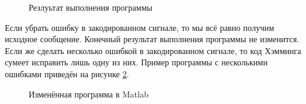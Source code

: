 \documentclass[a4paper,14pt]{extarticle}
\begin{document}
\begin{figure}[H]
\caption{Резлуьтат выполнения программы}
\label{2}
\end{figure}

Если убрать ошибку в закодированном сигнале, то мы всё равно получим исходное сообщение. Конечный результат выполнения программы не изменится.
Если же сделать несколько ошибкой в закодированном сигнале, то код Хэмминга сумеет исправить лишь одну из них. Пример программы с несколькими ошибками приведён на рисунке \ref{3}.

\begin{figure}[H]
\caption{Изменённая программа в Matlab}
\label{3}
\end{figure}
\end{document}
